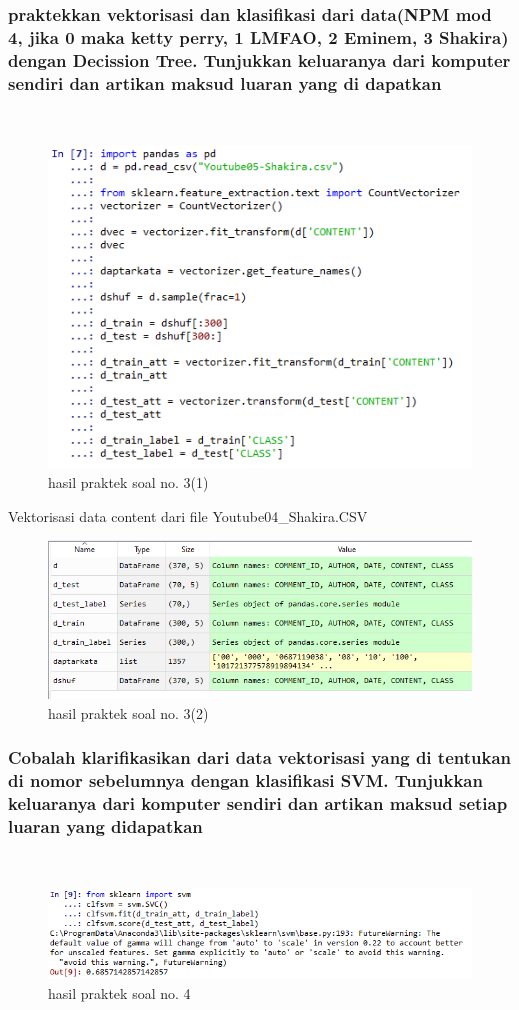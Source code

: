 \subsubsection{praktekkan vektorisasi dan klasifikasi dari data(NPM mod 4, jika 0 maka ketty perry, 1 LMFAO, 2 Eminem, 3 Shakira) dengan Decission Tree. Tunjukkan keluaranya dari komputer sendiri dan artikan maksud luaran yang di dapatkan}
\hfill\\



	\begin{figure}[H]
	\centering
		\includegraphics[width=8 cm]{figures/1174083/figures4/9.png}
	\caption{hasil praktek soal no. 3(1)}
	\end{figure}
	Vektorisasi data content dari file Youtube04\_Shakira.CSV
	\begin{figure}[H]
	\centering
		\includegraphics[width=8 cm]{figures/1174083/figures4/10.png}
	\caption{hasil praktek soal no. 3(2)}
	\end{figure}
	
\subsubsection{Cobalah klarifikasikan dari data vektorisasi yang di tentukan di nomor sebelumnya dengan klasifikasi SVM. Tunjukkan keluaranya dari komputer sendiri dan artikan maksud setiap luaran yang didapatkan}
\hfill\\

	\begin{figure}[H]
	\centering
		\includegraphics[width=8 cm]{figures/1174083/figures4/11.png}
	\caption{hasil praktek soal no. 4}
	\end{figure}

